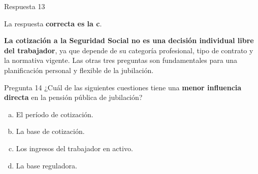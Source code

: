 \documentclass[
  ignorenonframetext,
  aspectratio=54,
  spanish,
]{beamer}
\providecommand{\tightlist}{%
  \setlength{\itemsep}{0pt}\setlength{\parskip}{0pt}}
\begin{document}
\begin{frame}{Respuesta 13}
\label{respuesta-13}
\begin{tcolorbox}[enhanced jigsaw, rightrule=.15mm, colback=white, arc=.35mm, colframe=quarto-callout-tip-color-frame, leftrule=.75mm, bottomrule=.15mm, left=2mm, toprule=.15mm, opacityback=0, breakable]
\begin{minipage}[t]{5.5mm}
\textcolor{quarto-callout-tip-color}{\faLightbulb}
\end{minipage}%
\begin{minipage}[t]{\textwidth - 5.5mm}

La respuesta \textbf{correcta es la c}.

\textbf{La cotización a la Seguridad Social no es una decisión
individual libre del trabajador}, ya que depende de su categoría
profesional, tipo de contrato y la normativa vigente. Las otras tres
preguntas son fundamentales para una planificación personal y flexible
de la jubilación.

\end{minipage}%
\end{tcolorbox}
\end{frame}

\begin{frame}{Pregunta 14}
\label{pregunta-14}
¿Cuál de las siguientes cuestiones tiene una \textbf{menor influencia
directa} en la pensión pública de jubilación?

\begin{enumerate}
[a.]
\tightlist
\item
  El período de cotización.\\
\item
  La base de cotización.\\
\item
  Los ingresos del trabajador en activo.\\
\item
  La base reguladora.
\end{enumerate}
\end{frame}
\end{document}
